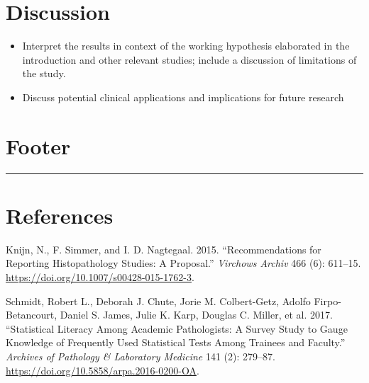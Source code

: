 \documentclass[
]{article}
\begin{document}
\pagebreak

\hypertarget{discussion}{%
\section{Discussion}\label{discussion}}

\begin{itemize}
\item
  Interpret the results in context of the working hypothesis elaborated
  in the introduction and other relevant studies; include a discussion
  of limitations of the study.
\item
  Discuss potential clinical applications and implications for future
  research
\end{itemize}

\pagebreak

\hypertarget{footer}{%
\section{Footer}\label{footer}}

\begin{center}\rule{0.5\linewidth}{0.5pt}\end{center}

\pagebreak

\hypertarget{references}{%
\section*{References}\label{references}}

\hypertarget{refs}{}
\leavevmode\hypertarget{ref-Knijn2015}{}%
Knijn, N., F. Simmer, and I. D. Nagtegaal. 2015. ``Recommendations for
Reporting Histopathology Studies: A Proposal.'' \emph{Virchows Archiv}
466 (6): 611--15. \url{https://doi.org/10.1007/s00428-015-1762-3}.

\leavevmode\hypertarget{ref-Schmidt2017}{}%
Schmidt, Robert L., Deborah J. Chute, Jorie M. Colbert-Getz, Adolfo
Firpo-Betancourt, Daniel S. James, Julie K. Karp, Douglas C. Miller, et
al. 2017. ``Statistical Literacy Among Academic Pathologists: A Survey
Study to Gauge Knowledge of Frequently Used Statistical Tests Among
Trainees and Faculty.'' \emph{Archives of Pathology \& Laboratory
Medicine} 141 (2): 279--87.
\url{https://doi.org/10.5858/arpa.2016-0200-OA}.
\end{document}
